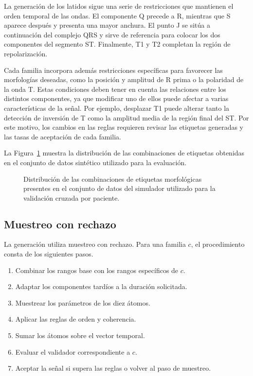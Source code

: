 La generación de los latidos sigue una serie de restricciones que mantienen el orden temporal de las ondas. El componente Q precede a R, mientras que S aparece después y presenta una mayor anchura. El punto J se sitúa a continuación del complejo QRS y sirve de referencia para colocar los dos componentes del segmento ST. Finalmente, T1 y T2 completan la región de repolarización.

Cada familia incorpora además restricciones específicas para favorecer las morfologías deseadas, como la posición y amplitud de R prima o la polaridad de la onda T. Estas condiciones deben tener en cuenta las relaciones entre los distintos componentes, ya que modificar uno de ellos puede afectar a varias características de la señal. Por ejemplo, desplazar T1 puede alterar tanto la detección de inversión de T como la amplitud media de la región final del ST. Por este motivo, los cambios en las reglas requieren revisar las etiquetas generadas y las tasas de aceptación de cada familia.

La Figura~\ref{fig:label_distribution} muestra la distribución de las combinaciones de etiquetas obtenidas en el conjunto de datos sintético utilizado para la evaluación.

\begin{figure}[H]
  \centering
  \caption{Distribución de las combinaciones de etiquetas morfológicas presentes en el conjunto de datos del simulador utilizado para la validación cruzada por paciente.}
  \label{fig:label_distribution}
\end{figure}

\subsection{Muestreo con rechazo}

La generación utiliza muestreo con rechazo. Para una familia \(c\), el procedimiento consta de los siguientes pasos.

\begin{enumerate}
\item Combinar los rangos base con los rangos específicos de \(c\).
\item Adaptar los componentes tardíos a la duración solicitada.
\item Muestrear los parámetros de los diez átomos.
\item Aplicar las reglas de orden y coherencia.
\item Sumar los átomos sobre el vector temporal.
\item Evaluar el validador correspondiente a \(c\).
\item Aceptar la señal si supera las reglas o volver al paso de muestreo.
\end{enumerate}


